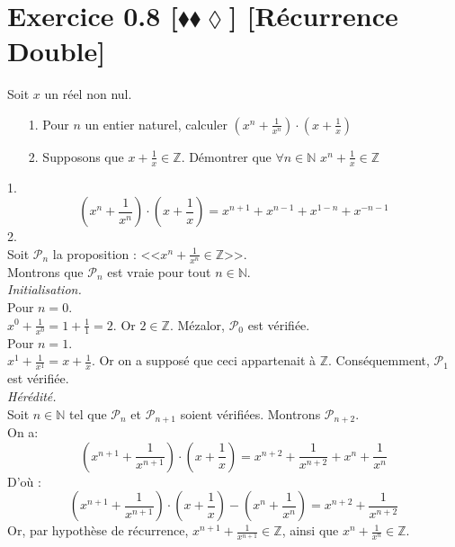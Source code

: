 \documentclass[10pt]{article}
\begin{document}
\section*{Exercice 0.8 [$\blacklozenge\blacklozenge\lozenge$] [Récurrence Double]}
\begin{tcolorbox}[enhanced, width=7in, center, size=fbox, fontupper=\large, drop shadow southwest]
    Soit $x$ un réel non nul.
    \begin{itemize}
        \item[1.] Pour $n$ un entier naturel, calculer $(x^n+\frac{1}{x^n})\cdot(x+\frac{1}{x})$
        \item[2.] Supposons que $x+\frac{1}{x}\in\mathbb{Z}$. Démontrer que $\forall n\in\mathbb{N}$ $x^n + \frac{1}{x}\in\mathbb{Z}$ 
    \end{itemize}
    1.
    \begin{equation*}
        (x^n + \frac{1}{x^n})\cdot(x+\frac{1}{x}) = x^{n+1}+x^{n-1}+x^{1-n}+x^{-n-1}
    \end{equation*}
    2.\\
    Soit $\mathcal{P}_n$ la proposition : <<$x^n+\frac{1}{x^n}\in\mathbb{Z}$>>.\\
    Montrons que $\mathcal{P}_n$ est vraie pour tout $n\in\mathbb{N}$.\\
    \emph{Initialisation.}\\
    Pour $n=0$.\\
    $x^0 + \frac{1}{x^0} = 1 + \frac{1}{1} = 2$. Or $2\in\mathbb{Z}$. Mézalor, $\mathcal{P}_0$ est vérifiée.\\
    Pour $n=1$.\\
    $x^1 + \frac{1}{x^1} = x + \frac{1}{x}$. Or on a supposé que ceci appartenait à $\mathbb{Z}$. Conséquemment, $\mathcal{P}_1$ est vérifiée.\\[0.5cm]
    \emph{Hérédité.}\\
    Soit $n\in\mathbb{N}$ tel que $\mathcal{P}_n$ et $\mathcal{P}_{n+1}$ soient vérifiées. Montrons $\mathcal{P}_{n+2}$.\\
    On a:
    \begin{equation*}
        (x^{n+1}+\frac{1}{x^{n+1}})\cdot(x+\frac{1}{x})=x^{n+2}+\frac{1}{x^{n+2}}+x^n+\frac{1}{x^{n}}
    \end{equation*}
    D'où :
    \begin{equation*}
        (x^{n+1}+\frac{1}{x^{n+1}})\cdot(x+\frac{1}{x})-(x^n+\frac{1}{x^n}) = x^{n+2}+\frac{1}{x^{n+2}}
    \end{equation*}
    Or, par hypothèse de récurrence, $x^{n+1}+\frac{1}{x^{n+1}}\in\mathbb{Z}$, ainsi que $x^n+\frac{1}{x^n}\in\mathbb{Z}$.\\

\end{tcolorbox}
\end{document}
